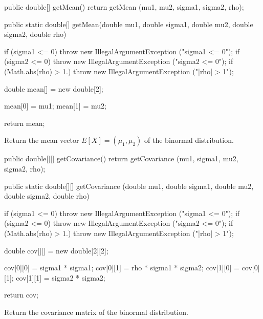 \begin{code}\begin{hide}

   public double[] getMean() {
      return getMean (mu1, mu2, sigma1, sigma2, rho);
   }\end{hide}

   public static double[] getMean(double mu1, double sigma1,
                                  double mu2, double sigma2, double rho)\begin{hide} {
      if (sigma1 <= 0)
         throw new IllegalArgumentException ("sigma1 <= 0");
      if (sigma2 <= 0)
         throw new IllegalArgumentException ("sigma2 <= 0");
      if (Math.abs(rho) > 1.)
         throw new IllegalArgumentException ("|rho| > 1");

      double mean[] = new double[2];

      mean[0] = mu1;
      mean[1] = mu2;

      return mean;
   }\end{hide}
\end{code}
\begin{tabb}
   Return the mean vector $E[X] = (\mu_1, \mu_2)$ of the binormal distribution.
\end{tabb}
\begin{code}\begin{hide}

   public double[][] getCovariance() {
      return getCovariance (mu1, sigma1, mu2, sigma2, rho);
   }\end{hide}

   public static double[][] getCovariance (double mu1, double sigma1,
                                           double mu2, double sigma2,
                                           double rho)\begin{hide} {
      if (sigma1 <= 0)
         throw new IllegalArgumentException ("sigma1 <= 0");
      if (sigma2 <= 0)
         throw new IllegalArgumentException ("sigma2 <= 0");
      if (Math.abs(rho) > 1.)
         throw new IllegalArgumentException ("|rho| > 1");

      double cov[][] = new double[2][2];

      cov[0][0] = sigma1 * sigma1;
      cov[0][1] = rho * sigma1 * sigma2;
      cov[1][0] = cov[0][1];
      cov[1][1] = sigma2 * sigma2;

      return cov;
   }\end{hide}
\end{code}
\begin{tabb}
   Return the covariance matrix of the binormal distribution.
\end{tabb}
